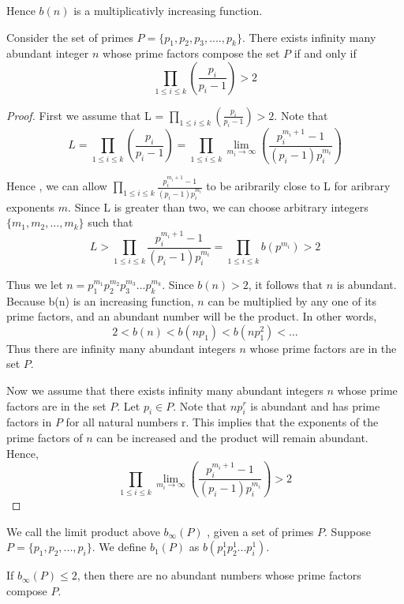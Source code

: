 \documentclass[../paper.tex]{article}
\begin{document}
Hence $b(n)$ is a multiplicativly increasing function.

\begin{theorem}\label{b_inf_1}
Consider the set of primes 
%
$P = \{p_{1}, p_{2}, p_{3}, .... , p_{k}\}$.
%
There exists infinity many abundant integer $n$ whose prime 
factors compose the set $P$  if and only if
%
$$\prod_{1 \leq i \leq k} (\frac{p_{i}}{p_{i} -1}) > 2$$
%
\end{theorem}

\begin{proof}

First we assume that  
%
L = $\prod_{1 \leq i \leq k} (\frac{p_{i}}{p_{i} -1}) > 2$.
%
Note that
%  
$$L = \prod_{1 \leq i \leq k} (\frac{p_{i}}{p_{i} -1}) 
%
= \prod_{1 \leq i \leq k} \lim_{m_i \rightarrow \infty} 
%
( \frac{p_i^{m_{i} + 1} -1}{(p_i -1)p_{i}^{m_{i}}})$$

Hence , we can allow
$\prod_{1 \leq i \leq k} \frac{p_i^{m_{i} + 1} -1}
{(p_i -1)p_{i}^{m_{i}}}$ to be aribrarily close to L for aribrary 
exponents $m$. Since L is greater than two, we can choose 
arbitrary integers $\{m_1, m_2, ... , m_k\}$ such that 
%
$$L > \prod_{1 \leq i \leq k} \frac{p_i^{m_{i} + 1} -1}
{(p_i -1)p_{i}^{m_{i}}} = \prod_{1 \leq i \leq k} b(p^{m_i}) > 2$$
%

Thus we let $n=p_1^{m_1}p_2^{m_2}p_3^{m_3}...p_{k}^{m_k}$. 
Since $b(n) > 2$, it follows that $n$ is abundant. 
Because b(n) is an increasing function, $n$ can be multiplied
by any one of its prime factors, and an abundant number 
will be the product. In other words,
%
$$2 < b(n) < b(np_1) < b(np_1^2) < ...$$
%
Thus there are infinity many abundant integers $n$ whose prime
factors are in the set $P$.

Now we assume that there exists infinity many abundant integers 
$n$ whose prime factors are in the set $P$. Let $p_i \in P$. Note
that $np_i^r$ is abundant and has prime factors in $P$ for all 
natural numbers r. This implies that the exponents of the prime 
factors of $n$ can be increased and the product will remain abundant. Hence,
%
$$\prod_{1 \leq i \leq k} \lim_{m_i \rightarrow \infty} 
( \frac{p_i^{m_{i} + 1} -1}{(p_i -1)p_{i}^{m_{i}}}) > 2$$

\end{proof}

We call the limit product above $b_{\infty}(P)$ , given a set of primes
$P$. Suppose $P = \{p_1, p_2, ..., p_i \}$. We define $b_1(P)$ as
$b(p_1^1 p_2^1 ... p_i^1)$.

\begin{theorem}
If $b_{\infty}(P) \leq 2$, then there are no abundant numbers 
whose prime factors compose $P$.
\end{theorem}
\end{document}
